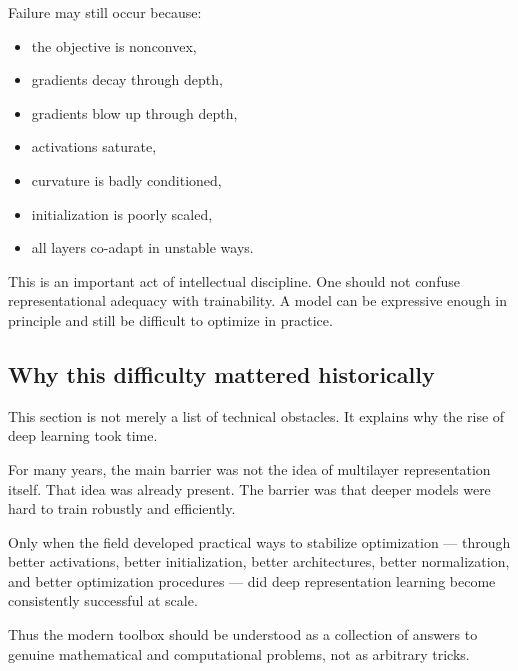Failure may still occur because:
\begin{itemize}
    \item the objective is nonconvex,
    \item gradients decay through depth,
    \item gradients blow up through depth,
    \item activations saturate,
    \item curvature is badly conditioned,
    \item initialization is poorly scaled,
    \item all layers co-adapt in unstable ways.
\end{itemize}

\medskip

This is an important act of intellectual discipline.
One should not confuse representational adequacy with trainability.
A model can be expressive enough in principle and still be difficult to optimize in practice.

\subsection*{Why this difficulty mattered historically}

This section is not merely a list of technical obstacles.
It explains why the rise of deep learning took time.

\medskip

For many years, the main barrier was not the idea of multilayer representation itself.
That idea was already present.
The barrier was that deeper models were hard to train robustly and efficiently.

\medskip

Only when the field developed practical ways to stabilize optimization --- through better activations, better initialization, better architectures, better normalization, and better optimization procedures --- did deep representation learning become consistently successful at scale.

\medskip

Thus the modern toolbox should be understood as a collection of answers to genuine mathematical and computational problems, not as arbitrary tricks.



